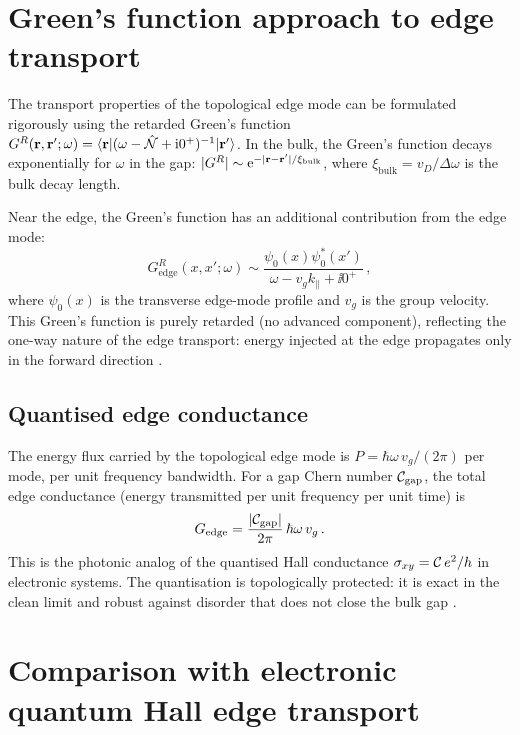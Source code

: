 \section{Green's function approach to edge transport}
\label{sec:ch8-green-function}

The transport properties of the topological edge mode can be
formulated rigorously using the retarded Green's function
$G^R(\mathbf{r},\mathbf{r}';\omega)=\langle\mathbf{r}|(\omega-\hat{\mathcal{N}}+\mathrm{i} 0^+)^{-1}
|\mathbf{r}'\rangle$.  In the bulk, the Green's function decays
exponentially for $\omega$ in the gap:
$|G^R|\sim\mathrm{e}^{-|\mathbf{r}-\mathbf{r}'|/\xi_{\mathrm{bulk}}}$, where
$\xi_{\mathrm{bulk}}=v_D/\Delta\omega$ is the bulk decay length.

Near the edge, the Green's function has an additional contribution
from the edge mode:
\begin{equation}\label{eq:ch8-edge-green}
  G^R_{\mathrm{edge}}(x,x';\omega)
  \sim \frac{\psi_0(x)\psi_0^*(x')}{\omega-v_g k_\parallel+\ii 0^+}\,,
\end{equation}
where $\psi_0(x)$ is the transverse edge-mode profile and $v_g$ is
the group velocity.  This Green's function is purely retarded (no
advanced component), reflecting the one-way nature of the edge
transport: energy injected at the edge propagates only in the forward
direction \cite{ozawa2018topological,silveirinha2016bulk}.

\subsection{Quantised edge conductance}
\label{sec:ch8-quantised-conductance}

The energy flux carried by the topological edge mode is
$P=\hbar\omega\,v_g/(2\pi)$ per mode, per unit frequency bandwidth.
For a gap Chern number $\mathcal{C}_{\mathrm{gap}}$, the total edge
conductance (energy transmitted per unit frequency per unit time) is
\begin{equation}\label{eq:ch8-edge-conductance}
  G_{\mathrm{edge}}
  = \frac{|\mathcal{C}_{\mathrm{gap}}|}{2\pi}\,\hbar\omega\,v_g\,.
\end{equation}
This is the photonic analog of the quantised Hall conductance
$\sigma_{xy}=\mathcal{C}\,e^2/h$ in electronic systems.  The quantisation
is topologically protected: it is exact in the clean limit and robust
against disorder that does not close the bulk gap
\cite{thouless1982quantized,haldane2008possible}.

\section{Comparison with electronic quantum Hall edge transport}
\label{sec:ch8-comparison-electronic}

